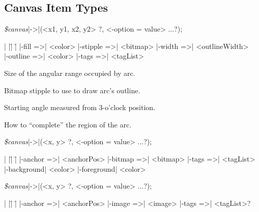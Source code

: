 
\subsection*{Canvas Item Types}

{\samepage
{\it \$canvas}|->|(<x1, y1, x2, y2> ?, <-option =\> value> ...?);
\begin{tabbing}
|                  |\=|                    |\= \kill
|-fill =>| <color>     \> |-stipple =>| <bitmap> \> |-width =>| <outlineWidth> \\
|-outline =>| <color>  \> |-tags =>| <tagList>   \> \\
\end{tabbing}
}
\vspace{-10pt}

\begin{enum}{1cm}

Size of the angular range occupied by arc.

Bitmap stipple to use to draw arc's outline.

Starting angle measured from 3-o'clock position.

How to ``complete'' the region of the arc.

\end{enum}
\vskip5pt

{\samepage

{\it \$canvas}|->|(<x, y> ?, <-option =\> value> ...?);
\begin{tabbing}
|                   |\=|                |\= \kill
|-anchor =>| <anchorPos>  \> |-bitmap =>| <bitmap>    \> |-tags =>| <tagList> \\
|-background| <color>  \> |-foreground| <color> \> \\
\end{tabbing}
}

{\samepage
{\it \$canvas}|->|(<x, y> ?, <-option =\> value> ...?);
\begin{tabbing}
|                   |\=|                |\= \kill
|-anchor =>| <anchorPos> \> |-image =>| <image> \> |-tags =>| <tagList>? \\
\end{tabbing}
}

